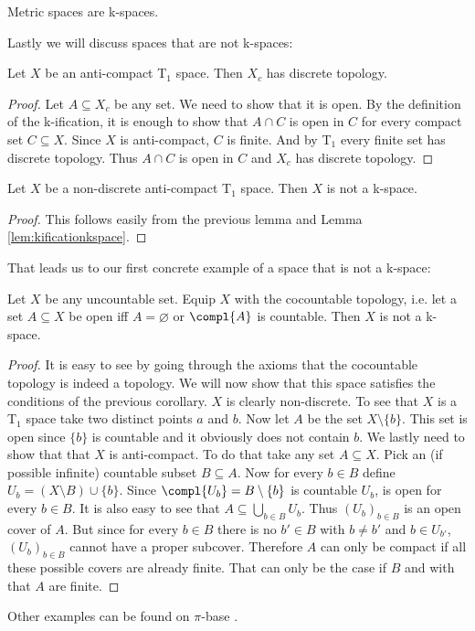 \begin{cor}
    Metric spaces are k-spaces.
\end{cor}

Lastly we will discuss spaces that are not k-spaces:

\begin{lem}
    Let $X$ be an anti-compact T$_1$ space.
    Then $X_c$ has discrete topology.
\end{lem}
\begin{proof}
    Let $A \subseteq X_c$ be any set. We need to show that it is open. 
    By the definition of the k-ification, it is enough to show that $A \cap C$
    is open in $C$ for every compact set $C \subseteq X$. 
    Since $X$ is anti-compact, $C$ is finite.
    And by T$_1$ every finite set has discrete topology. 
    Thus $A \cap C$ is open in $C$ and $X_c$ has discrete topology.
\end{proof}

\begin{cor}
    Let $X$ be a non-discrete anti-compact T$_1$ space.
    Then $X$ is not a k-space.
\end{cor}
\begin{proof}
    This follows easily from the previous lemma and Lemma \ref{lem:kificationkspace}.
\end{proof}

That leads us to our first concrete example of a space that is not a k-space: 

\begin{example}
    Let $X$ be any uncountable set.
    Equip $X$ with the cocountable topology, i.e. let a set $A \subseteq X$ be open iff $A = \varnothing$ or $\compl{A}$ is countable.
    Then $X$ is not a k-space.
\end{example}
\begin{proof}
    It is easy to see by going through the axioms that the cocountable topology is indeed a topology. 
    We will now show that this space satisfies the conditions of the previous corollary.
    $X$ is clearly non-discrete. 
    To see that $X$ is a T$_1$ space take two distinct points $a$ and $b$. 
    Now let $A$ be the set $X\setminus \{b\}$. 
    This set is open since $\{b\}$ is countable and it obviously does not contain $b$. 
    We lastly need to show that that $X$ is anti-compact. 
    To do that take any set $A \subseteq X$.
    Pick an (if possible infinite) countable subset $B \subseteq A$. 
    Now for every $b \in B$ define $U_b = (X \setminus B) \cup \{b\}$.
    Since $\compl{U_b} = B \setminus\{b\}$ is countable $U_b$, is open for every $b \in B$.
    It is also easy to see that $A \subseteq \bigcup_{b \in B}U_b$. 
    Thus $(U_b)_{b \in B}$ is an open cover of $A$. 
    But since for every $b \in B$ there is no $b' \in B$ with $b \ne b'$ and $b \in U_{b'}$, $(U_b)_{b \in B}$ cannot have a proper subcover.
    Therefore $A$ can only be compact if all these possible covers are already finite. 
    That can only be the case if $B$ and with that $A$ are finite. 
\end{proof}

Other examples can be found on $\pi$-base \cite{PiBase2024}.
